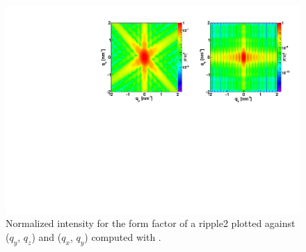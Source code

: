 \begin{figure}[h]
\begin{center}
\includegraphics[width=\textwidth]{Figures/figffripple2}
\end{center}
\caption{Normalized intensity for the form factor of a ripple2 plotted against ($q_y$, $q_z$) and  ($q_x$, $q_y$)
  computed with .}
\label{fig:FFripple2Ex}
\end{figure}




